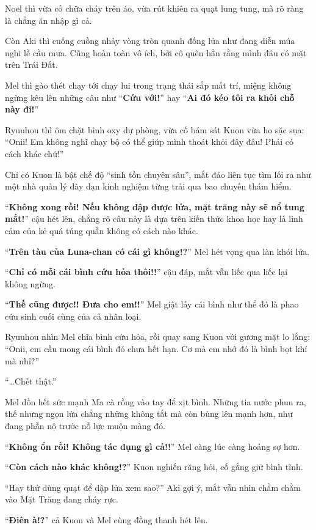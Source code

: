 \documentclass[../main.tex]{subfiles}
\begin{document}
Noel thì vừa cố chữa cháy trên áo, vừa rút khiên ra quạt lung tung, mà rõ ràng là chẳng ăn nhập gì cả.

Còn Aki thì cuống cuồng nhảy vòng tròn quanh đống lửa như đang diễn múa nghi lễ cầu mưa. Cũng hoàn toàn vô ích, bởi cô quên hẳn rằng mình đâu có mặt trên Trái Đất.

Mel thì gào thét chạy tới chạy lui trong trạng thái sắp mất trí, miệng không ngừng kêu lên những câu như ``\textbf{Cứu với!}'' hay ``\textbf{Ai đó kéo tôi ra khỏi chỗ này đi!}''

Ryuuhou thì ôm chặt bình oxy dự phòng, vừa cố bám sát Kuon vừa ho sặc sụa: ``Onii! Em không nghĩ chạy bộ có thể giúp mình thoát khỏi đây đâu! Phải có cách khác chứ!''

Chỉ có Kuon là bật chế độ ``sinh tồn chuyên sâu'', mắt đảo liên tục tìm lối ra như một nhà quản lý dày dạn kinh nghiệm từng trải qua bao chuyến thám hiểm.

``\textbf{Không xong rồi! Nếu không dập được lửa, mặt trăng này sẽ nổ tung mất!}'' cậu hét lên, chẳng rõ câu này là dựa trên kiến thức khoa học hay là linh cảm của kẻ quá túng quẫn không có cách nào khác.

``\textbf{Trên tàu của Luna-chan có cái gì không!?}'' Mel hét vọng qua làn khói lửa.

``\textbf{Chỉ có mỗi cái bình cứu hỏa thôi!!}'' cậu đáp, mắt vẫn liếc qua liếc lại không ngừng.

``\textbf{Thế cũng được!! Đưa cho em!!}'' Mel giật lấy cái bình như thể đó là phao cứu sinh cuối cùng của cả nhân loại.

Ryuuhou nhìn Mel chĩa bình cứu hỏa, rồi quay sang Kuon với gương mặt lo lắng: ``Onii, em cầu mong cái bình đó chưa hết hạn. Cơ mà em nhớ đó là bình bọt khí mà nhỉ?''

``\dots Chết thật.''

Mel dồn hết sức mạnh Ma cà rồng vào tay để xịt bình. Những tia nước phun ra, thế nhưng ngọn lửa chẳng những không tắt mà còn bùng lên mạnh hơn, như đang phẫn nộ trước nỗ lực muộn màng đó.

``\textbf{Không ổn rồi! Không tác dụng gì cả!!}'' Mel càng lúc càng hoảng sợ hơn.

``\textbf{Còn cách nào khác không!?}'' Kuon nghiến răng hỏi, cố gắng giữ bình tĩnh.

``Hay thử dùng quạt để dập lửa xem sao?'' Aki gợi ý, mắt vẫn nhìn chằm chằm vào Mặt Trăng đang cháy rực.

``\textbf{Điên à!?}'' cả Kuon và Mel cùng đồng thanh hét lên.
\end{document}
